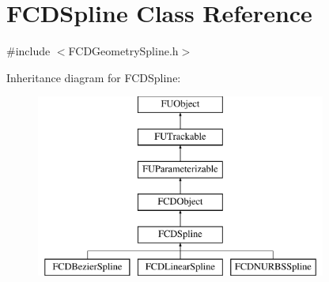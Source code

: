\hypertarget{classFCDSpline}{
\section{FCDSpline Class Reference}
\label{classFCDSpline}
}


{\ttfamily \#include $<$FCDGeometrySpline.h$>$}

Inheritance diagram for FCDSpline:\begin{figure}[H]
\begin{center}
\leavevmode
\includegraphics[height=6.000000cm]{classFCDSpline}
\end{center}
\end{figure}
